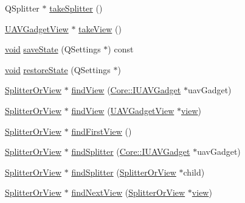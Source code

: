 \begin{DoxyCompactItemize}
\item 
Q\-Splitter $\ast$ \hyperlink{group___core_plugin_ga752524f83f9d68f2eaa404fe060498c3}{take\-Splitter} ()
\item 
\hyperlink{class_core_1_1_internal_1_1_u_a_v_gadget_view}{U\-A\-V\-Gadget\-View} $\ast$ \hyperlink{group___core_plugin_ga21d8dac3ce456267bbd7a220637a7e49}{take\-View} ()
\item 
\hyperlink{group___u_a_v_objects_plugin_ga444cf2ff3f0ecbe028adce838d373f5c}{void} \hyperlink{group___core_plugin_ga388c7d30aa5e75b3ec771e66566eb5f1}{save\-State} (Q\-Settings $\ast$) const 
\item 
\hyperlink{group___u_a_v_objects_plugin_ga444cf2ff3f0ecbe028adce838d373f5c}{void} \hyperlink{group___core_plugin_ga9ab64d930eee17a2e95b851689b08336}{restore\-State} (Q\-Settings $\ast$)
\item 
\hyperlink{class_core_1_1_internal_1_1_splitter_or_view}{Splitter\-Or\-View} $\ast$ \hyperlink{group___core_plugin_ga52a86e796c14405fa7b471c1d9bfae40}{find\-View} (\hyperlink{class_core_1_1_i_u_a_v_gadget}{Core\-::\-I\-U\-A\-V\-Gadget} $\ast$uav\-Gadget)
\item 
\hyperlink{class_core_1_1_internal_1_1_splitter_or_view}{Splitter\-Or\-View} $\ast$ \hyperlink{group___core_plugin_ga924d2e411dff3c084aa3d19454905274}{find\-View} (\hyperlink{class_core_1_1_internal_1_1_u_a_v_gadget_view}{U\-A\-V\-Gadget\-View} $\ast$\hyperlink{group___core_plugin_ga885a960ed8f9cdcfa3e01e739743f93d}{view})
\item 
\hyperlink{class_core_1_1_internal_1_1_splitter_or_view}{Splitter\-Or\-View} $\ast$ \hyperlink{group___core_plugin_ga9527e06232dae22e08f41dd4644a4157}{find\-First\-View} ()
\item 
\hyperlink{class_core_1_1_internal_1_1_splitter_or_view}{Splitter\-Or\-View} $\ast$ \hyperlink{group___core_plugin_ga9f0ee5b870e11e9a8830c4a9574d6ef0}{find\-Splitter} (\hyperlink{class_core_1_1_i_u_a_v_gadget}{Core\-::\-I\-U\-A\-V\-Gadget} $\ast$uav\-Gadget)
\item 
\hyperlink{class_core_1_1_internal_1_1_splitter_or_view}{Splitter\-Or\-View} $\ast$ \hyperlink{group___core_plugin_ga89d985d2b5b76f8fe7c5f3a6864501d9}{find\-Splitter} (\hyperlink{class_core_1_1_internal_1_1_splitter_or_view}{Splitter\-Or\-View} $\ast$child)
\item 
\hyperlink{class_core_1_1_internal_1_1_splitter_or_view}{Splitter\-Or\-View} $\ast$ \hyperlink{group___core_plugin_ga473bc573c4330a7de38e9ca7222b72c5}{find\-Next\-View} (\hyperlink{class_core_1_1_internal_1_1_splitter_or_view}{Splitter\-Or\-View} $\ast$\hyperlink{group___core_plugin_ga885a960ed8f9cdcfa3e01e739743f93d}{view})

\end{DoxyCompactItemize}
